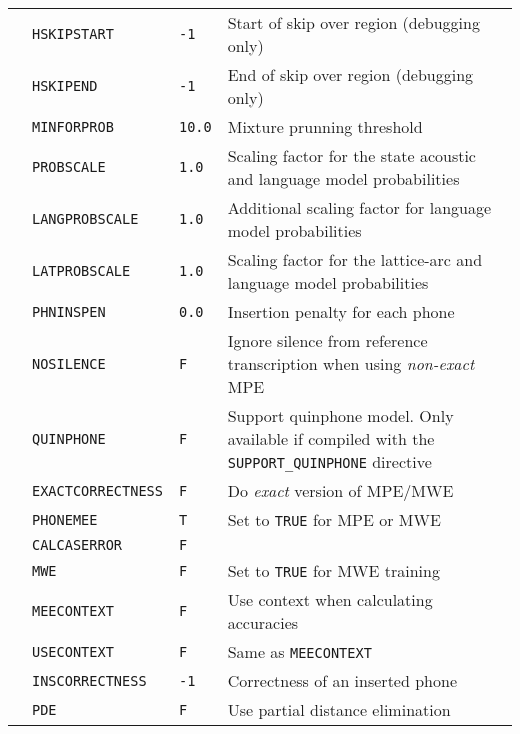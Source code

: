 \begin{center}
\begin{supertabular}{|p{1.4cm}|l|l|p{6.6cm}|}
 & \texttt{HSKIPSTART} & \texttt{-1} & Start of skip over region (debugging only) \\ 
  & \texttt{HSKIPEND} & \texttt{-1} & End of skip over region (debugging only) \\ \hline

  & \texttt{MINFORPROB} & \texttt{10.0} & Mixture prunning threshold \\ 
  & \texttt{PROBSCALE} & \texttt{1.0} & Scaling factor for the state acoustic and language model probabilities \\ 
  & \texttt{LANGPROBSCALE} & \texttt{1.0} & Additional scaling factor for language model probabilities \\ 
  & \texttt{LATPROBSCALE} & \texttt{1.0} & Scaling factor for the lattice-arc and language model probabilities \\ 
  & \texttt{PHNINSPEN} & \texttt{0.0} & Insertion penalty for each phone \\ 
  & \texttt{NOSILENCE} & \texttt{F} & Ignore silence from reference transcription when using \emph{non-exact} MPE \\ 
  & \texttt{QUINPHONE} & \texttt{F} & Support quinphone model. Only available if compiled with the \texttt{SUPPORT\_QUINPHONE} directive \\ 
  & \texttt{EXACTCORRECTNESS} & \texttt{F} & Do \emph{exact} version of MPE/MWE \\ 
  & \texttt{PHONEMEE} & \texttt{T} & Set to \texttt{TRUE} for MPE or MWE \\ 
  & \texttt{CALCASERROR} & \texttt{F} &  \\ 
  & \texttt{MWE} & \texttt{F} & Set to \texttt{TRUE} for MWE training \\ 
  & \texttt{MEECONTEXT} & \texttt{F} & Use context when calculating accuracies \\ 
  & \texttt{USECONTEXT} & \texttt{F} & Same as \texttt{MEECONTEXT} \\ 
  & \texttt{INSCORRECTNESS} & \texttt{-1} & Correctness of an inserted phone \\ 
  & \texttt{PDE} & \texttt{F} & Use partial distance elimination \\ \hline


\end{supertabular}
\end{center}
